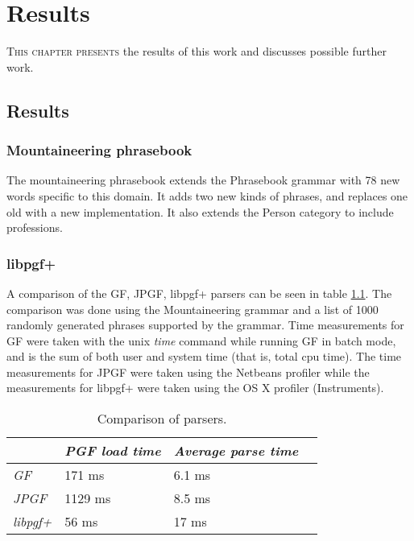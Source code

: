 \chapter{Results}
\lettrine[lines=4, loversize=-0.1, lraise=0.1]{T}{his chapter presents} the results of this work and discusses possible further work.


\section{Results}


\subsection{Mountaineering phrasebook}
The mountaineering phrasebook extends the Phrasebook grammar with 78 new words specific to this domain. It adds two new kinds of phrases, and replaces one old with a new implementation. It also extends the Person category to include professions.


\subsection{libpgf+}
A comparison of the GF, JPGF, libpgf+ parsers can be seen in table \ref{tbl:parsercomparison}. The comparison was done using the Mountaineering grammar and a list of 1000 randomly generated phrases supported by the grammar. Time measurements for GF were taken with the unix \emph{time} command while running GF in batch mode, and is the sum of both user and system time (that is, total cpu time). The time measurements for JPGF were taken using the Netbeans profiler while the measurements for libpgf+ were taken using the OS X profiler (Instruments).

\begin{table}
\begin{center}
\begin{tabular}{|l|l|l|l|}
	\hline
	 & \emph{PGF load time} & \emph{Average parse time} \\ \hline
	\emph{GF} & 171 ms & 6.1 ms \\ \hline
	\emph{JPGF} & 1129 ms & 8.5 ms \\ \hline
	\emph{libpgf+} & 56 ms & 17 ms \\ \hline
\end{tabular}
\end{center}
\caption{Comparison of parsers.}
\label{tbl:parsercomparison}
\end{table}


